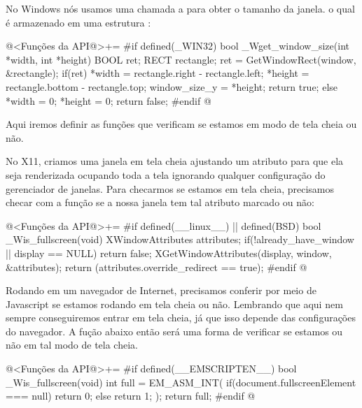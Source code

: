 
No Windows nós usamos uma chamada a  para
obter o tamanho da janela. o qual é armazenado em uma
estrutura :

\iniciocodigo
@<Funções da API@>+=
#if defined(_WIN32)
bool _Wget_window_size(int *width, int *height){
  BOOL ret;
  RECT rectangle;
  ret = GetWindowRect(window, &rectangle);
  if(ret){
    *width = rectangle.right - rectangle.left;
    *height = rectangle.bottom - rectangle.top;
    window_size_y = *height;
    return true;
  }
  else{
    *width = 0;
    *height = 0;
    return false;
  }
}
#endif
@
\fimcodigo


Aqui iremos definir as funções que verificam se estamos em modo de
tela cheia ou não.


No X11, criamos uma janela em tela cheia ajustando um atributo para
que ela seja renderizada ocupando toda a tela ignorando qualquer
configuração do gerenciador de janelas. Para checarmos se estamos em
tela cheia, precisamos checar com a
função  se a nossa janela tem tal
atributo marcado ou não:

\iniciocodigo
@<Funções da API@>+=
#if defined(__linux__) || defined(BSD)
bool _Wis_fullscreen(void){
  XWindowAttributes attributes;
  if(!already_have_window || display == NULL)
    return false;
  XGetWindowAttributes(display, window, &attributes);
  return (attributes.override_redirect == true);
}
#endif
@


Rodando em um navegador de Internet, precisamos conferir por meio de
Javascript se estamos rodando em tela cheia ou não. Lembrando que aqui
nem sempre conseguiremos entrar em tela cheia, já que isso depende das
configurações do navegador. A fução abaixo então será uma forma de
verificar se estamos ou não em tal modo de tela cheia.

\iniciocodigo
@<Funções da API@>+=
#if defined(__EMSCRIPTEN__)
bool _Wis_fullscreen(void){
  int full = EM_ASM_INT({
    if(document.fullscreenElement === null){
      return 0;
    } else{
      return 1;
    }
  });
  return full;
}
#endif
@


